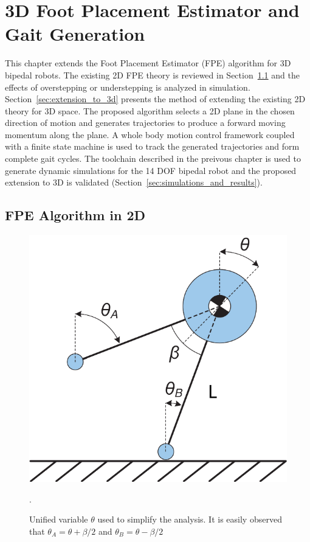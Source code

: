 \chapter{3D Foot Placement Estimator and Gait Generation} %
\label{cha:simulations}

This chapter extends the Foot Placement Estimator (FPE) algorithm for 3D bipedal robots. The existing 2D FPE theory is reviewed in Section~\ref{sec:fpe_algorithm} and the effects of overstepping or understepping is analyzed in simulation. Section~\ref{sec:extension_to_3d} presents the method of extending the existing 2D theory for 3D space. The proposed algorithm selects a 2D plane in the chosen direction of motion and generates trajectories to produce a forward moving momentum along the plane. A whole body motion control framework coupled with a finite state machine is used to track the generated trajectories and form complete gait cycles. The toolchain described in the preivous chapter is used to generate dynamic simulations for the 14 DOF bipedal robot and the proposed extension to 3D is validated (Section~\ref{sec:simulations_and_results}).

\section{FPE Algorithm in 2D} %
\label{sec:fpe_algorithm}

\begin{figure}[!h]
	\centering
    \includegraphics[scale=0.7]{fig/simulations/compass.pdf}
  	\caption{Unified variable $\theta$ used to simplify the analysis. It is easily observed that $\theta_A = \theta  + \beta /2$ and $\theta_B = \theta  - \beta /2$}.
	\label{fig:unified}
\end{figure}

